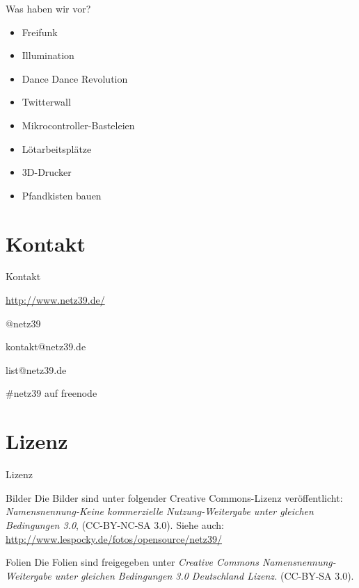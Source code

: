 \documentclass[hyperref={pdfpagelabels=false}]{beamer}
\begin{document}
\begin{frame}{Was haben wir vor?}
    \begin{itemize}
        \item Freifunk
        \item Illumination
        \item Dance Dance Revolution
        \item Twitterwall
        \item Mikrocontroller-Basteleien
        \item Lötarbeitsplätze
        \item 3D-Drucker
        \item Pfandkisten bauen
    \end{itemize}
\end{frame}

\section{Kontakt}

\begin{frame}{Kontakt}
    \begin{center}
        \begin{description}
            \item[WWW] \url{http://www.netz39.de/}
            \item[Twitter/identi.ca] @netz39
            \item[E-Mail] kontakt@netz39.de
            \item[Mailingliste] list@netz39.de
            \item[IRC] \#netz39 auf freenode
        \end{description}
    \end{center}
\end{frame}

\appendix

\section{Lizenz}

\begin{frame}{Lizenz}
    \begin{block}{Bilder}
        Die Bilder sind unter folgender Creative Commons-Lizenz
        veröffentlicht: \emph{Namensnennung-Keine kommerzielle
        Nutzung-Weitergabe unter gleichen Bedingungen 3.0}, (CC-BY-NC-SA
        3.0). Siehe auch:
        \url{http://www.lespocky.de/fotos/opensource/netz39/}
    \end{block}
    \begin{block}{Folien}
        Die Folien sind freigegeben unter \emph{Creative Commons
        Namensnennung-Weitergabe unter gleichen Bedingungen 3.0 Deutschland
        Lizenz.} (CC-BY-SA 3.0).
    \end{block}
\end{frame}
\end{document}
